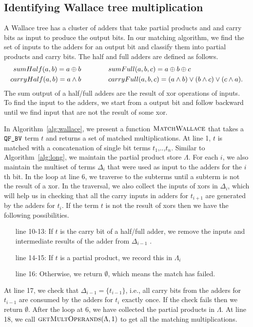 \subsection{Identifying Wallace tree multiplication}


A Wallace tree has a cluster of adders that take partial products and 
and carry bits as input to produce the output bits.
%
In our matching algorithm, we find the set of inputs
to the adders for an output bit and classify them into
partial products and carry bits.
%
The half and full adders are defined as follows.
\begin{align*}
sumHalf(a,b) = a \oplus b  \qquad& \qquad sumFull(a,b,c) = a \oplus b \oplus c\\
carryHalf(a,b) = a \land b \qquad&\qquad
carryFull(a,b,c) = (a \land b) \lor (b \land c) \lor (c \land a).
\end{align*}
%
The sum output of a half/full adders are the result of 
xor operations of inputs.
%
To find the input to the adders, we start from a
output bit and follow backward until we find input that
are not the result of some xor.

In Algorithm~\ref{alg:wallace}, we present a function
$\textsc{MatchWallace}$ that takes a $\texttt{QF\_BV}$ term $t$ and returns a
set of matched multiplications.
%
At line 1, $t$ is matched with a concatenation of single bit terms $t_1$,..,$t_n$.
%
Similar to Algorithm~\ref{alg:long},
we maintain the partial product store $\Lambda$.
%
For each $i$,
we also maintain the multiset of terms $\Delta_i$ that were used as 
input to the adders for the $i$th bit.
%
In the loop at line 6, we traverse to the subterms until
a subterm is not the result of a xor.
%
In the traversal, we also collect the inputs of xors in $\Delta_i$, which
will help us in checking that all the carry inputs in adders for $t_{i+1}$
are generated by the adders for $t_i$.
%
If the term $t$ is not the result of xors then
we have the following possibilities.
%
\begin{itemize}
\item[line 10-13:]
  If $t$ is the carry bit of a half/full adder, we remove the inputs 
  and intermediate results
  of the adder from $\Delta_{i-1}$ .
\item[line 14-15:] If $t$ is a partial product, we record this in $\Lambda_i$
\item[line 16:] Otherwise, we return $\emptyset$, which means the match has failed.
\end{itemize}
At line 17, we check that $\Delta_{i-1} = \{t_{i-1}\}$, i.e., all carry bits from
the adders for $t_{i-1}$ are consumed by the adders for $t_i$ exactly once.
%
If the check fails then we return $\emptyset$.
%
After the loop at 6, we have collected the partial products in $\Lambda$.
%
At line 18, we call $\textsc{getMultOperands}(\Lambda,1)$ to get all
the matching multiplications.

